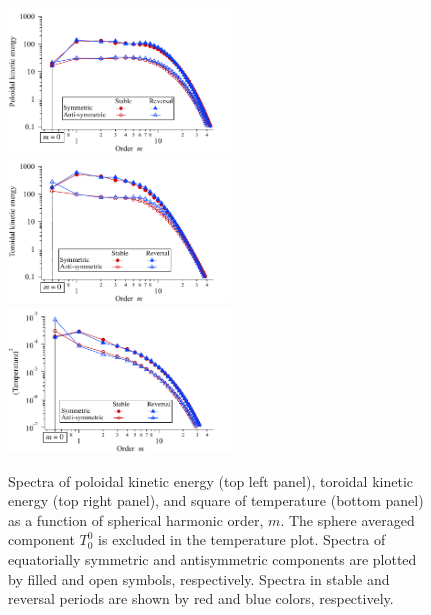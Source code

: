 \begin{figure}[tb]
\hfill
\includegraphics*[width=59mm]{Figures/Kpol_spectr_m.pdf} %
\hfill
\includegraphics*[width=59mm]{Figures/Ktor_spectr_m.pdf} \hfill \\
\includegraphics*[width=59mm]{Figures/Temp_spectr_m.pdf}
\caption{
Spectra of poloidal kinetic energy (top left panel), toroidal kinetic energy (top right panel), and square of temperature (bottom panel) as a function of spherical harmonic order, $m$. 
The sphere averaged component $T_{0}^{0}$ is excluded in the temperature plot.
Spectra of equatorially symmetric and antisymmetric components are plotted by filled and open symbols, respectively.
Spectra in stable and reversal periods are shown by red and blue colors, respectively.
}
\label{fig:KE_temp_spectra_m}
\end{figure}